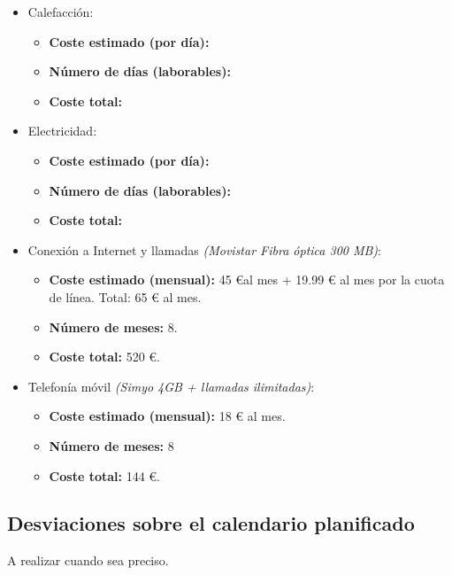 \documentclass[twoside]{report}
\begin{document}
\begin{itemize}

\item Calefacción:
	\begin{itemize}
		\item \textbf{Coste estimado (por día):}
		\item \textbf{Número de días (laborables):}
		\item \textbf{Coste total:}
	\end{itemize}
	
\item Electricidad:
	\begin{itemize}
		\item \textbf{Coste estimado (por día):}
		\item \textbf{Número de días (laborables):}
		\item \textbf{Coste total:}
	\end{itemize}
	
\item Conexión a Internet y llamadas \textit{(Movistar Fibra óptica 300 MB)}:
	\begin{itemize}
		\item \textbf{Coste estimado (mensual):} 45 \euro \hspace{0.1cm}al mes + 19.99 \euro \hspace{0.1cm} al mes por la cuota de línea. Total: 65 \euro \hspace{0.1cm} al mes.
		\item \textbf{Número de meses:} 8.
		\item \textbf{Coste total:} 520 \euro.
	\end{itemize}
		
\item Telefonía móvil \textit{(Simyo 4GB + llamadas ilimitadas)}:
	\begin{itemize}
		\item \textbf{Coste estimado (mensual):} 18 \euro \hspace{0.1cm} al mes.
		\item \textbf{Número de meses:} 8
		\item \textbf{Coste total:} 144 \euro.
	\end{itemize}

\end{itemize}

\subsection{Desviaciones sobre el calendario planificado}
A realizar cuando sea preciso.
\end{document}
